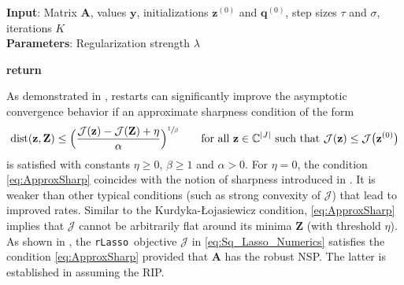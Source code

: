 \documentclass[11pt,reqno, a4paper]{article}
\numberwithin{equation}{section}
\newcommand{\rlasso}{\texttt{rLasso}}
\begin{document}
\begin{algorithm}[H]
\caption{Primal-Dual Hybrid Gradient Method (PDHGM) for \rlasso}\label{alg:PDHGM}
\textbf{Input}: Matrix $\mathbf A$, values $\mathbf{y}$, initializations $\mathbf{z}^{(0)}$ and $\mathbf q^{(0)}$, step sizes $\tau$ and $\sigma$, iterations $K$\\
\textbf{Parameters}: Regularization strength $\lambda$
\begin{algorithmic}[1]
\State {} 
\State {}
\State {}
\State {}
\State {}
\State {}
\EndFor
\State \textbf{return} 
\EndFunction
\end{algorithmic}
\end{algorithm}

As demonstrated in \cite{AdcCol2025}, restarts can significantly improve the asymptotic convergence behavior if an approximate sharpness condition of the form 
\begin{equation}\label{eq:ApproxSharp}
    \mathrm{dist}(\mathbf z, \mathbf Z) \leq \Bigl(\frac{\mathcal J(\mathbf z) - \mathcal J(\mathbf Z) + \eta}{\alpha}\Bigr)^{\sfrac{1}{\beta}} \qquad \text{for all } \mathbf z \in \mathbb C^{\lvert J\rvert} \text{ such that } \mathcal J(\mathbf z) \leq \mathcal J\bigl(\mathbf z^{(0)}\bigr)
\end{equation}
is satisfied with constants $\eta \geq 0$, $\beta\geq 1$ and $\alpha>0$. 
For $\eta=0$, the condition \eqref{eq:ApproxSharp} coincides with the notion of sharpness introduced in \cite{RouAsp2020}.
It is weaker than other typical conditions (such as strong convexity of $\mathcal J$) that lead to improved rates.
Similar to the Kurdyka-{\L}ojasiewicz condition, \eqref{eq:ApproxSharp} implies that $\mathcal J$ cannot be arbitrarily flat around its minima $\mathbf Z$ (with threshold $\eta$).
As shown in \cite[Subsection 5.3]{AdcCol2025}, the \rlasso \ objective $\mathcal J$ in \eqref{eq:Sq_Lasso_Numerics} satisfies the condition \eqref{eq:ApproxSharp} provided that $\mathbf A$ has the robust NSP.
The latter is established in  assuming the RIP.
\end{document}
